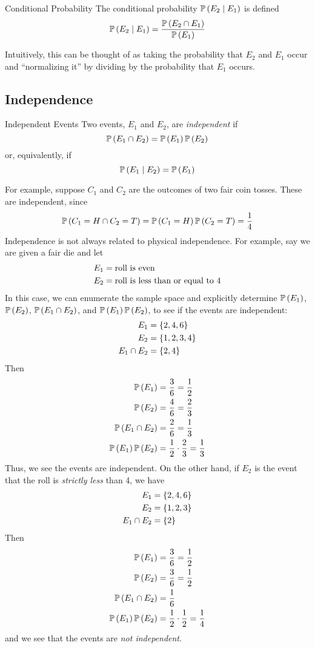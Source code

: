 \begin{definition}{Conditional Probability}{}
    The conditional probability $\operatorname{\mathbb{P}}\left(E_2 \mid E_1\right)$ is defined
\[\operatorname{\mathbb{P}}\left(E_2 \mid E_1\right) = \frac{\operatorname{\mathbb{P}}\left(E_2 \cap E_1\right)}{\operatorname{\mathbb{P}}\left(E_1\right)}\]
\end{definition}

Intuitively, this can be thought of as taking the probability that $E_2$ and
$E_1$ occur and ``normalizing it'' by dividing by the probability that $E_1$
occurs. 

\subsection{Independence}
\begin{definition}{Independent Events}{}
Two events, $E_1$ and $E_2$, are \emph{independent} if
\[\operatorname{\mathbb{P}}\left(E_1 \cap E_2\right) = \operatorname{\mathbb{P}}\left(E_1\right)\operatorname{\mathbb{P}}\left(E_2\right)\]
or, equivalently, if
\[\operatorname{\mathbb{P}}\left(E_1 \mid E_2\right) = \operatorname{\mathbb{P}}\left(E_1\right)\]
\end{definition}
For example, suppose $C_1$ and $C_2$ are the outcomes of two fair coin tosses.
These are independent, since
\[\operatorname{\mathbb{P}}\left(C_1 = H \cap C_2 = T\right) = \operatorname{\mathbb{P}}\left(C_1 = H\right)\operatorname{\mathbb{P}}\left(C_2 = T\right) = \frac{1}{4}\]
Independence is not always related to physical independence. For example, say we
are given a fair die and let
\begin{align*}
    E_1 &= \hbox{roll is even}\\
    E_2 &= \hbox{roll is less than or equal to 4}
\end{align*}
In this case, we can enumerate the sample space and explicitly determine
$\operatorname{\mathbb{P}}\left(E_1\right)$, $\operatorname{\mathbb{P}}\left(E_2\right)$, $\operatorname{\mathbb{P}}\left(E_1 \cap E_2\right)$, and $\operatorname{\mathbb{P}}\left(E_1\right)\operatorname{\mathbb{P}}\left(E_2\right)$,
to see if the events are independent:
\begin{align*}
    E_1 &= \left\lbrace2, 4, 6\right\rbrace\\
    E_2 &= \left\lbrace1, 2, 3, 4\right\rbrace\\
    E_1 \cap E_2 &= \left\lbrace2, 4\right\rbrace
\end{align*}
Then
\begin{align*}
    \operatorname{\mathbb{P}}\left(E_1\right) &= \frac{3}{6} = \frac{1}{2}\\
    \operatorname{\mathbb{P}}\left(E_2\right) &= \frac{4}{6} = \frac{2}{3}\\
    \operatorname{\mathbb{P}}\left(E_1 \cap E_2\right) &= \frac{2}{6} = \frac{1}{3}\\
    \operatorname{\mathbb{P}}\left(E_1\right)\operatorname{\mathbb{P}}\left(E_2\right) &= \frac{1}{2} \cdot \frac{2}{3} = \frac{1}{3}
\end{align*}
Thus, we see the events are independent. On the other hand, if $E_2$ is the
event that the roll is \emph{strictly less} than 4, we have
\begin{align*}
    E_1 &= \left\lbrace2, 4, 6\right\rbrace\\
    E_2 &= \left\lbrace1, 2, 3\right\rbrace\\
    E_1 \cap E_2 &= \left\lbrace2\right\rbrace
\end{align*}
Then
\begin{align*}
    \operatorname{\mathbb{P}}\left(E_1\right) &= \frac{3}{6} = \frac{1}{2}\\
    \operatorname{\mathbb{P}}\left(E_2\right) &= \frac{3}{6} = \frac{1}{2}\\
    \operatorname{\mathbb{P}}\left(E_1 \cap E_2\right) &= \frac{1}{6}\\
    \operatorname{\mathbb{P}}\left(E_1\right)\operatorname{\mathbb{P}}\left(E_2\right) &= \frac{1}{2} \cdot \frac{1}{2} = \frac{1}{4}
\end{align*}
and we see that the events are \emph{not independent}.

